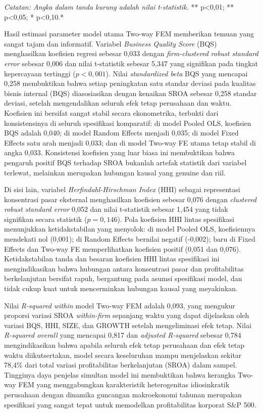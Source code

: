 \documentclass[12pt,a4paper]{article}
\begin{document}
\emph{Catatan: Angka dalam tanda kurung adalah nilai t-statistik. }**
p\textless0,01; ** p\textless0,05; * p\textless0,10.*

Hasil estimasi parameter model utama Two-way FEM memberikan temuan yang
sangat tajam dan informatif. Variabel \emph{Business Quality Score}
(BQS) menghasilkan koefisien regresi sebesar 0,033 dengan
\emph{firm-clustered robust standard error} sebesar 0,006 dan nilai
t-statistik sebesar 5,347 yang signifikan pada tingkat kepercayaan
tertinggi (\(p < 0{,}001\)). Nilai \emph{standardized beta} BQS yang
mencapai 0,258 membuktikan bahwa setiap peningkatan satu standar deviasi
pada kualitas bisnis internal (BQS) diasosiasikan dengan kenaikan SROA
sebesar 0,258 standar deviasi, setelah mengendalikan seluruh efek tetap
perusahaan dan waktu. Koefisien ini bersifat sangat stabil secara
ekonometrika, terbukti dari konsistensinya di seluruh spesifikasi
komparatif: di model Pooled OLS, koefisien BQS adalah 0,040; di model
Random Effects menjadi 0,035; di model Fixed Effects satu arah menjadi
0,033; dan di model Two-way FE utama tetap stabil di angka 0,033.
Konsistensi koefisien yang luar biasa ini membuktikan bahwa pengaruh
positif BQS terhadap SROA bukanlah artefak statistik dari variabel
terlewat, melainkan merupakan hubungan kausal yang genuine dan riil.

Di sisi lain, variabel \emph{Herfindahl-Hirschman Index} (HHI) sebagai
representasi konsentrasi pasar eksternal menghasilkan koefisien sebesar
0,076 dengan \emph{clustered robust standard error} 0,052 dan nilai
t-statistik sebesar 1,454 yang tidak signifikan secara statistik
(\(p = 0{,}146\)). Pola koefisien HHI lintas spesifikasi menunjukkan
ketidakstabilan yang menyolok: di model Pooled OLS, koefisiennya
mendekati nol (0,001); di Random Effects bernilai negatif (-0,002); baru
di Fixed Effects dan Two-way FE memperlihatkan koefisien positif (0,051
dan 0,076). Ketidakstabilan tanda dan besaran koefisien HHI lintas
spesifikasi ini mengindikasikan bahwa hubungan antara konsentrasi pasar
dan profitabilitas berkelanjutan bersifat rapuh, bergantung pada asumsi
spesifikasi model, dan tidak cukup kuat untuk mencerminkan hubungan
kausal yang meyakinkan.

Nilai \emph{R-squared within} model Two-way FEM adalah 0,093, yang
mengukur proporsi variasi SROA \emph{within-firm} sepanjang waktu yang
dapat dijelaskan oleh variasi BQS, HHI, SIZE, dan GROWTH setelah
mengeliminasi efek tetap. Nilai \emph{R-squared overall} yang mencapai
0,817 dan \emph{adjusted R-squared} sebesar 0,784 mengindikasikan bahwa
apabila seluruh efek tetap perusahaan dan efek tetap waktu
diikutsertakan, model secara keseluruhan mampu menjelaskan sekitar
78,4\% dari total variasi profitabilitas berkelanjutan (SROA) dalam
sampel. Tingginya daya penjelas simultan model ini membuktikan bahwa
kerangka Two-way FEM yang menggabungkan karakteristik heterogenitas
idiosinkratik perusahaan dengan dinamika guncangan makroekonomi tahunan
merupakan spesifikasi yang sangat tepat untuk memodelkan profitabilitas
korporat S\&P 500.
\end{document}
